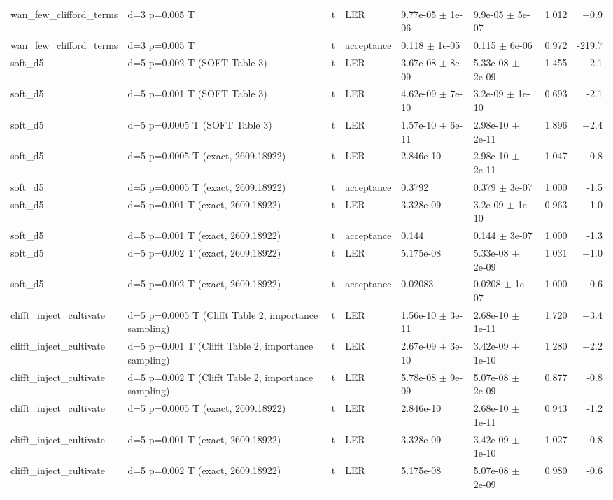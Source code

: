 \documentclass[10pt]{article}
\begin{document}
{\begin{longtable}{l l l l l l r r}
wan\_few\_clifford\_terms & d=3 p=0.005 T & t & LER & 9.77e-05 $\pm$ 1e-06 & 9.9e-05 $\pm$ 5e-07 & 1.012 & +0.9 \\
wan\_few\_clifford\_terms & d=3 p=0.005 T & t & acceptance & 0.118 $\pm$ 1e-05 & 0.115 $\pm$ 6e-06 & 0.972 & -219.7 \\
soft\_d5 & d=5 p=0.002 T (SOFT Table 3) & t & LER & 3.67e-08 $\pm$ 8e-09 & 5.33e-08 $\pm$ 2e-09 & 1.455 & +2.1 \\
soft\_d5 & d=5 p=0.001 T (SOFT Table 3) & t & LER & 4.62e-09 $\pm$ 7e-10 & 3.2e-09 $\pm$ 1e-10 & 0.693 & -2.1 \\
soft\_d5 & d=5 p=0.0005 T (SOFT Table 3) & t & LER & 1.57e-10 $\pm$ 6e-11 & 2.98e-10 $\pm$ 2e-11 & 1.896 & +2.4 \\
soft\_d5 & d=5 p=0.0005 T (exact, 2609.18922) & t & LER & 2.846e-10 & 2.98e-10 $\pm$ 2e-11 & 1.047 & +0.8 \\
soft\_d5 & d=5 p=0.0005 T (exact, 2609.18922) & t & acceptance & 0.3792 & 0.379 $\pm$ 3e-07 & 1.000 & -1.5 \\
soft\_d5 & d=5 p=0.001 T (exact, 2609.18922) & t & LER & 3.328e-09 & 3.2e-09 $\pm$ 1e-10 & 0.963 & -1.0 \\
soft\_d5 & d=5 p=0.001 T (exact, 2609.18922) & t & acceptance & 0.144 & 0.144 $\pm$ 3e-07 & 1.000 & -1.3 \\
soft\_d5 & d=5 p=0.002 T (exact, 2609.18922) & t & LER & 5.175e-08 & 5.33e-08 $\pm$ 2e-09 & 1.031 & +1.0 \\
soft\_d5 & d=5 p=0.002 T (exact, 2609.18922) & t & acceptance & 0.02083 & 0.0208 $\pm$ 1e-07 & 1.000 & -0.6 \\
clifft\_inject\_cultivate & d=5 p=0.0005 T (Clifft Table 2, importance sampling) & t & LER & 1.56e-10 $\pm$ 3e-11 & 2.68e-10 $\pm$ 1e-11 & 1.720 & +3.4 \\
clifft\_inject\_cultivate & d=5 p=0.001 T (Clifft Table 2, importance sampling) & t & LER & 2.67e-09 $\pm$ 3e-10 & 3.42e-09 $\pm$ 1e-10 & 1.280 & +2.2 \\
clifft\_inject\_cultivate & d=5 p=0.002 T (Clifft Table 2, importance sampling) & t & LER & 5.78e-08 $\pm$ 9e-09 & 5.07e-08 $\pm$ 2e-09 & 0.877 & -0.8 \\
clifft\_inject\_cultivate & d=5 p=0.0005 T (exact, 2609.18922) & t & LER & 2.846e-10 & 2.68e-10 $\pm$ 1e-11 & 0.943 & -1.2 \\
clifft\_inject\_cultivate & d=5 p=0.001 T (exact, 2609.18922) & t & LER & 3.328e-09 & 3.42e-09 $\pm$ 1e-10 & 1.027 & +0.8 \\
clifft\_inject\_cultivate & d=5 p=0.002 T (exact, 2609.18922) & t & LER & 5.175e-08 & 5.07e-08 $\pm$ 2e-09 & 0.980 & -0.6 \\

\end{longtable}}
\end{document}
